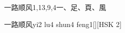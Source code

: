 \begin{entry}{一路顺风}{1,13,9,4}{⼀、⾜、⾴、⾵}
  \begin{phonetics}{一路顺风}{yi2 lu4 shun4 feng1}[][HSK 2]
  \end{phonetics}
\end{entry}
